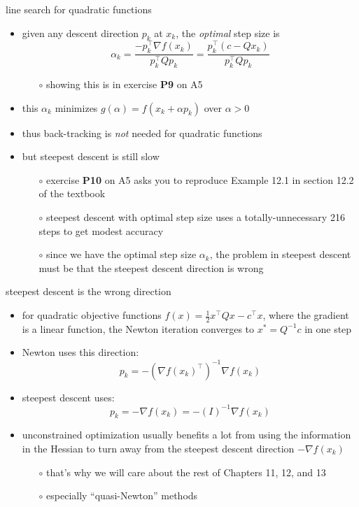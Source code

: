 \documentclass[10pt,hyperref]{beamer}
\newcommand{\grad}{\nabla}
\begin{document}
\begin{frame}{line search for quadratic functions}

\begin{itemize}
\item given any descent direction $p_k$ at $x_k$, the \emph{optimal} step size is
    $$\alpha_k = \frac{-p_k^\top \grad f(x_k)}{p_k^\top Q p_k} = \frac{p_k^\top (c - Q x_k)}{p_k^\top Q p_k}$$
    \begin{itemize}
    \item[$\circ$] showing this is in exercise \textbf{P9} on A5
    \end{itemize}
\item this $\alpha_k$ minimizes $g(\alpha) = f(x_k + \alpha p_k)$ over $\alpha>0$
\item thus back-tracking is \emph{not} needed for quadratic functions

\bigskip
\item \alert{but} steepest descent is still slow
    \begin{itemize}
    \item[$\circ$] exercise \textbf{P10} on A5 asks you to reproduce Example 12.1 in section 12.2 of the textbook
    \item[$\circ$] steepest descent with optimal step size uses a totally-unnecessary 216 steps to get modest accuracy
    \item[$\circ$] since we have the optimal step size $\alpha_k$, the problem in steepest descent \alert{must be that the steepest descent direction is wrong}
    \end{itemize}

\end{itemize}
\end{frame}


\begin{frame}{steepest descent is the wrong direction}

\begin{itemize}
\item for quadratic objective functions $f(x)=\frac{1}{2} x^\top Q x - c^\top x$, where the gradient is a linear function, the \alert{Newton iteration converges to $x^*=Q^{-1}c$ in one step}
\item Newton uses this direction:
    $$p_k = - \left(\grad f(x_k)^\top\right)^{-1} \grad f(x_k)$$
\item steepest descent uses:
    $$p_k = - \grad f(x_k) = - (I)^{-1} \grad f(x_k)$$
\item unconstrained optimization usually benefits a lot from using the information in the Hessian to turn away from the steepest descent direction $-\grad f(x_k)$
    \begin{itemize}
    \item[$\circ$] that's why we will care about the rest of Chapters 11, 12, and 13
    \item[$\circ$] especially ``quasi-Newton'' methods
    \end{itemize}
\end{itemize}
\end{frame}
\end{document}

